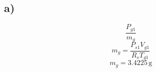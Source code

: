 

\subsection*{a)}
\[
\frac{P_{g1}}{m_g}
\]
\[
m_g = \frac{P_{s1} V_{g1}}{R_s T_{g1}}
\]
\[
m_g = 3.4225 \, \text{g}
\]